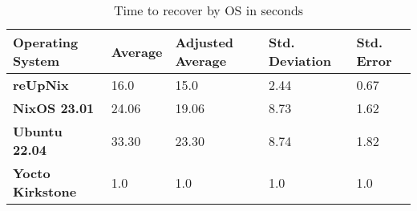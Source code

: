 \begin{table}[H]
	\centering
	\begin{tabular}{l|l|l|l|l}
	\toprule
		Operating System & Average & Adjusted Average\footnote &  Std. Deviation & Std. Error \\
	\midrule
    \textbf{reUpNix} & 16.0 & 15.0 &  2.44 & 0.67 \\
    \textbf{NixOS 23.01} & 24.06 & 19.06 & 8.73 & 1.62 \\
    \textbf{Ubuntu 22.04} & 33.30 & 23.30 & 8.74 & 1.82 \\
    \textbf{Yocto Kirkstone} & 1.0 & 1.0 & 1.0  & 1.0 \\
	\bottomrule
	\end{tabular}
	\caption{Time to recover by OS in seconds}
	\label{tab:timetorecover}
\end{table}

